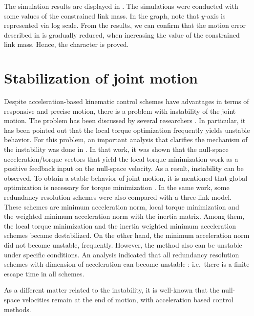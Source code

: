%

The simulation results are displayed in .
The simulations were conducted with some values of the constrained link mass.
In the graph,
note that $y$-axis is represented via log scale.
From the results,
we can confirm that the motion error described in  is gradually reduced,
when increasing the value of the constrained link mass.
Hence, the character is proved.


\section{Stabilization of joint motion}
Despite acceleration-based kinematic control schemes have advantages in terms of
responsive and precise motion,
there is a problem with instability of the joint motion.
The problem has been discussed by several researchers \cite{ONeil2000,ONeil2002,Hollerbach1985}.
In particular, it has been pointed out that 
the local torque optimization frequently yields unstable behavior.
For this problem,
an important analysis that clarifies the mechanism of the instability was done in \cite{Maciejewski1991}.
In that work,
it was shown that the null-space acceleration/torque vectors that yield the local torque minimization
work as a positive feedback input on the null-space velocity.
As a result, instability can be observed.
To obtain a stable behavior of joint motion,
it is mentioned that global optimization is necessary for torque minimization \cite{Hollerbach1987}.
In the same work,
some redundancy resolution schemes were also compared with a three-link model.
These schemes are minimum acceleration norm, local torque minimization and
the weighted minimum acceleration norm with the inertia matrix.
Among them, the local torque minimization and the inertia weighted minimum acceleration schemes
became destabilized.
On the other hand,
the minimum acceleration norm did not become unstable, frequently.
However, the method also can be unstable under specific conditions.
An analysis indicated that all redundancy resolution schemes with dimension of acceleration
can become unstable \cite{Maciejewski1991}:
i.e.\ there is a finite escape time in all schemes.

As a different matter related to the instability,
it is well-known that the null-space velocities remain at the end of motion,
with acceleration based control methods.


